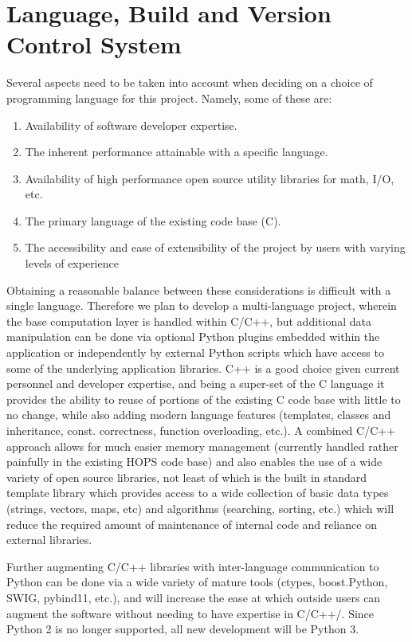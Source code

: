 

\section{Language, Build and Version Control System}
\label{sec:language}

Several aspects need to be taken into account when deciding on a choice of programming language for this project. Namely, some of these are:
\begin{enumerate}
 \item Availability of software developer expertise.
 \item The inherent performance attainable with a specific language.
 \item Availability of high performance open source utility libraries for math, I/O, etc.
 \item The primary language of the existing code base (C).
 \item The accessibility and ease of extensibility of the project by users with varying levels of experience
\end{enumerate}

Obtaining a reasonable balance between these considerations is difficult with a single language. Therefore we
plan to develop a multi-language project, wherein the base computation layer is handled within C/C++,
but additional data manipulation can be done via optional Python plugins embedded within the application
or independently by external Python scripts which have access to some of the underlying application libraries.
C++ is a good choice given current personnel and developer expertise, and being a super-set of the C language
it provides the ability to reuse of portions of the existing C code base with little to no change, while also adding modern language features
(templates, classes and inheritance, const. correctness, function overloading, etc.). A combined C/C++ approach
allows for much easier memory management (currently handled rather painfully in the existing HOPS code base) and also
enables the use of a wide variety of open source libraries, not least of which is the built in standard template library
which provides access to a wide collection of basic data types (strings, vectors, maps, etc) and algorithms (searching, sorting, etc.)
which will reduce the required amount of maintenance of internal code and reliance on external libraries.

Further augmenting C/C++ libraries with inter-language communication to Python can be done via a wide variety of mature tools
(ctypes, boost.Python, SWIG, pybind11, etc.), and will increase the ease at which outside users can augment the software without
needing to have expertise in C/C++/. Since Python 2 is no longer supported, all new development will be Python 3.

